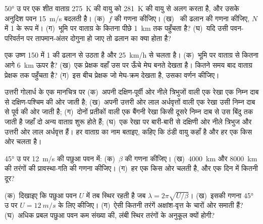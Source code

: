 \begin{exercise}[$\star$]\label{exo:b2:weather-systems:1}
\ang{50} उ पर एक शीत वाताग्र \qty{275}{K} की वायु को \qty{281}{K} की वायु से अलग करता है, और उसके अनुदिश
पवन \qty{15}{m/s} बदलती है। (क)~$f$ की गणना कीजिए। (ख)~ की ढलान की गणना कीजिए,
$N$ में 1 के रूप में। (ग)~भूमि पर वाताग्र के कितना पीछे 
\qty{1}{km} तक पहुँचता है? (घ)~यदि उसी पवन-परिवर्तन पर तापमान-अंतर
दोगुना हो जाए तो ढलान का क्या होता है?
\end{exercise}

\begin{exercise}[$\star$]\label{exo:b2:weather-systems:2}
एक उष्ण  150 में 1 की ढलान से उठता है और \qty{25}{km/h} से चलता है। (क)~भूमि पर
वाताग्र से कितना आगे  \qty{6}{km} ऊपर है? (ख)~एक प्रेक्षक वहाँ उस पर ऊँचे मेघ बनते
देखता है। कितने समय बाद वाताग्र प्रेक्षक तक पहुँचता है? (ग)~इस बीच प्रेक्षक जो मेघ-क्रम देखता है,
उसका वर्णन कीजिए।
\end{exercise}

\begin{exercise}[$\star$]\label{exo:b2:weather-systems:3}
उत्तरी गोलार्ध के एक मानचित्र पर (क)~अपनी दक्षिण-पूर्वी ओर नीले त्रिभुजों वाली एक रेखा एक निम्न दाब से
दक्षिण-पश्चिम की ओर जाती है; (ख)~अपनी उत्तरी ओर लाल अर्धवृत्तों वाली एक रेखा उसी निम्न दाब से पूर्व की ओर जाती है;
(ग)~दोनों प्रतीकों वाली एक बैंगनी रेखा किसी दूसरे निम्न दाब से उस बिंदु तक जाती है जहाँ दो अन्य वाताग्र शुरू होते हैं;
(घ)~एक रेखा पर बारी-बारी से दक्षिणी ओर नीले त्रिभुज और उत्तरी ओर लाल अर्धवृत्त हैं।
हर वाताग्र का नाम बताइए, कहिए कि ठंडी वायु कहाँ है और हर एक किस ओर चलता है।
\end{exercise}

\begin{exercise}[$\star$]\label{exo:b2:weather-systems:4}
\ang{45} उ पर \qty{12}{m/s} की पछुआ पवन में: (क)~$\beta$ की गणना कीजिए। (ख)~\qty{4000}{km} और \qty{8000}{km}
की तरंगों की प्रावस्था-गति की गणना कीजिए। (ग)~हर एक किस ओर चलती है, और एक दिन में
कितनी दूर?
\end{exercise}

\begin{exercise}[$\star\star$]\label{exo:b2:weather-systems:5}
(क)~दिखाइए कि पछुआ पवन $U$ में  तब स्थिर रहती है जब $\lambda = 2\pi\sqrt{U/\beta}$।
(ख)~इसकी गणना \ang{45} उ पर $U = \qty{12}{m/s}$ के लिए कीजिए। (ग)~ऐसी कितनी तरंगें
अक्षांश-वृत्त के चारों ओर समाती हैं? (घ)~अधिक प्रबल पछुआ पवन कम संख्या की, लंबी स्थिर तरंगों के अनुकूल क्यों होगी?
\end{exercise}

